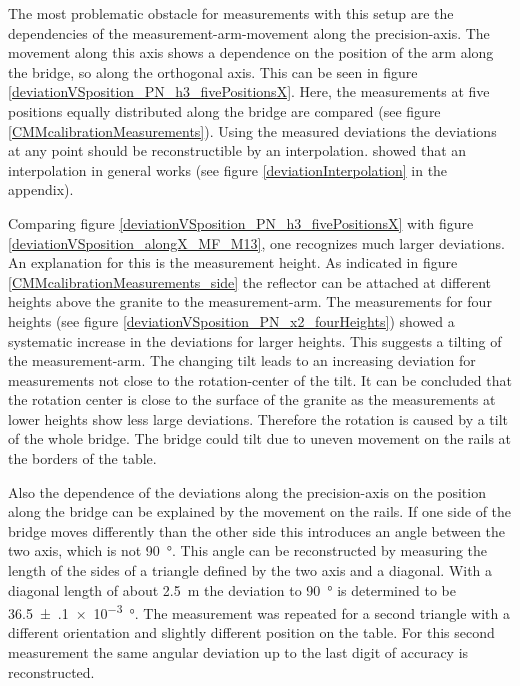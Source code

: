 \documentclass[
twoside,            %
BCOR1.4cm,          %
10pt,               %
headings=normal,    %
headsepline,        %
clearplainpage,		%
final,              %
div=14,
open=right,
bibliography=toc
]{scrreprt}
\begin{document}
The most problematic obstacle for measurements with this setup are the dependencies of the measurement-arm-movement along the precision-axis.
The movement along this axis shows a dependence on the position of the arm along the bridge, so along the orthogonal axis.
This can be seen in figure \ref{deviationVSposition_PN_h3_fivePositionsX}.
Here, the measurements at five positions equally distributed along the bridge are compared (see figure \ref{CMMcalibrationMeasurements}).
Using the measured deviations the deviations at any point should be reconstructible by an interpolation.
\cite{feilThesis} showed that an interpolation in general works (see figure \ref{deviationInterpolation} in the appendix).

Comparing figure \ref{deviationVSposition_PN_h3_fivePositionsX} with figure \ref{deviationVSposition_alongX_MF_M13}, one recognizes much larger deviations.
An explanation for this is the measurement height.
As indicated in figure \ref{CMMcalibrationMeasurements_side} the reflector can be attached at different heights above the granite to the measurement-arm.
The measurements for four heights (see figure \ref{deviationVSposition_PN_x2_fourHeights}) showed a systematic increase in the deviations for larger heights.
This suggests a tilting of the measurement-arm.
The changing tilt leads to an increasing deviation for measurements not close to the rotation-center of the tilt.
It can be concluded that the rotation center is close to the surface of the granite as the measurements at lower heights show less large deviations.
Therefore the rotation is caused by a tilt of the whole bridge.
The bridge could tilt due to uneven movement on the rails at the borders of the table.

Also the dependence of the deviations along the precision-axis on the position along the bridge can be explained by the movement on the rails.
If one side of the bridge moves differently than the other side this introduces an angle between the two axis, which is not \SI{90}{\degree}.
This angle can be reconstructed by measuring the length of the sides of a triangle defined by the two axis and a diagonal.
With a diagonal length of about \SI{2.5}{m} the deviation to \SI{90}{\degree} is determined to be \SI{36.5(1)e-3}{\degree}.
The measurement was repeated for a second triangle with a different orientation and slightly different position on the table.
For this second measurement the same angular deviation up to the last digit of accuracy is reconstructed. 
\end{document}
